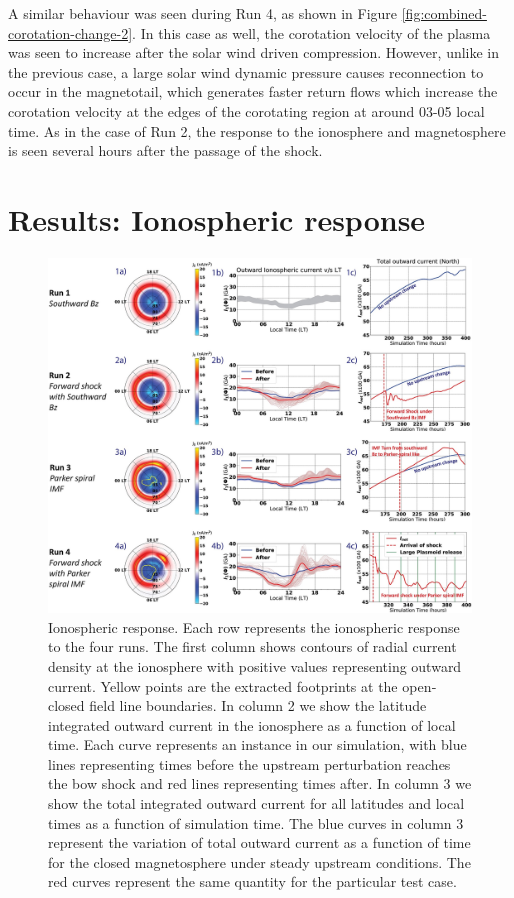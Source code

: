 A similar behaviour was seen during Run 4, as shown in Figure \ref{fig:combined-corotation-change-2}. In this case as well, the corotation velocity of the plasma was seen to increase after the solar wind driven compression. However, unlike in the previous case, a large solar wind dynamic pressure causes reconnection to occur in the magnetotail, which generates faster return flows which increase the corotation velocity at the edges of the corotating region at around 03-05 local time. As in the case of Run 2, the response to the ionosphere and magnetosphere is seen several hours after the passage of the shock.

\section{Results: Ionospheric response}

\begin{figure}
    \centering
    \includegraphics[width=\textwidth]{images3/ionosphere-currents.jpg}
    \caption{Ionospheric response. Each row represents the ionospheric response to the four runs. The first column shows contours of radial current density at the ionosphere with positive values representing outward current. Yellow points are the extracted footprints at the open‐closed field line boundaries. In column 2 we show the latitude integrated outward current in the ionosphere as a function of local time. Each curve represents an instance in our simulation, with blue lines representing times before the upstream perturbation reaches the bow shock and red lines representing times after. In column 3 we show the total integrated outward current for all latitudes and local times as a function of simulation time. The blue curves in column 3 represent the variation of total outward current as a function of time for the closed magnetosphere under steady upstream conditions. The red curves represent the same quantity for the particular test case.}
    \label{fig:ionosphere-currents}
\end{figure}

